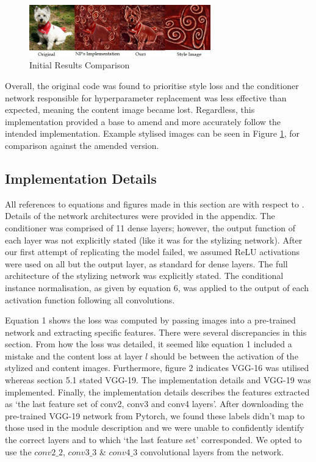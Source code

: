 \documentclass{article} %
\begin{document}
\begin{figure}[h!]
\centering
\includegraphics[width=0.7\textwidth]{GitHubvsOwn.jpg}
\vspace{-3mm}
\caption{Initial Results Comparison}
\vspace{1mm}
\label{fig:GitHubvsOwn}
\vspace{-2mm}
\end{figure}

Overall, the original code was found to prioritise style loss and the conditioner network responsible for hyperparameter replacement was less effective than expected, meaning the content image became lost. Regardless, this implementation provided a base to amend and more accurately follow the intended implementation. Example stylised images can be seen in Figure \ref{fig:GitHubvsOwn}, for comparison against the amended version.

\subsection{Implementation Details}

All references to equations and figures made in this section are with respect to \cite{babaeizadeh2018adjustable}. Details of the network architectures were provided in the appendix. The conditioner was comprised of 11 dense layers; however, the output function of each layer was not explicitly stated (like it was for the stylizing network). After our first attempt of replicating the model failed, we assumed ReLU activations were used on all but the output layer, as standard for dense layers. The full architecture of the stylizing network was explicitly stated. The conditional instance normalisation, as given by equation 6, was applied to the output of each activation function following all convolutions.

Equation 1 shows the loss was computed by passing images into a pre-trained network and extracting specific features. There were several discrepancies in this section. From how the loss was detailed, it seemed like equation 1 included a mistake and the content loss at layer \(l\) should be between the activation of the stylized and content images. Furthermore, figure \(2\) indicates VGG-16 was utilised whereas section 5.1 stated VGG-19. The implementation details and VGG-19 was implemented. Finally, the implementation details describes the features extracted as `the last feature set of conv2, conv3 and conv4 layers'. After downloading the pre-trained VGG-19 network from Pytorch, we found these labels didn't map to those used in the module description and we were unable to confidently identify the correct layers and to which `the last feature set' corresponded. We opted to use the $conv2\_2$, $conv3\_3$ \& $conv4\_3$ convolutional layers from the network.
\end{document}
